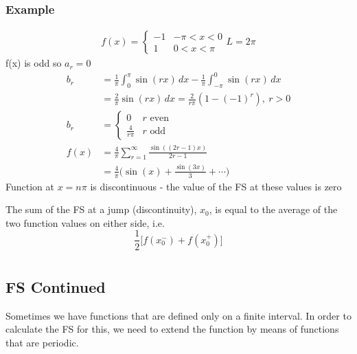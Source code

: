 \documentclass[a4paper, 11pt, normalem]{report}
\begin{document}
\subsection{Example}
\begin{gather*}
    f(x) =  \begin{cases}
                -1 & -\pi < x < 0 \\
                1 & 0 < x < \pi
            \end{cases}
    L = 2\pi
\end{gather*}
f(x) is odd so $a_r = 0$
\begin{align*}
    b_r &= \frac{1}{\pi} \int_{0}^{\pi} \sin(rx) \, dx - \frac{1}{\pi} \int_{-\pi}^{0} \sin(rx) \, dx \\
    &= \frac{2}{\pi} \sin(rx) \, dx = \frac{2}{r\pi} (1 - (-1)^r),~ r > 0 \\
    b_r &=  \begin{cases}
                0 & r \text{ even} \\
                \frac{4}{r\pi} & r \text{ odd}
            \end{cases} \\
    f(x) &= \frac{4}{\pi} \sum_{r = 1}^{\infty} \frac{\sin((2r - 1)x)}{2r - 1}\\
         &= \frac{4}{\pi} \Big(\sin(x) + \frac{\sin(3x)}{3} + \cdots \Big)
\end{align*}
Function at $x = n\pi$ is discontinuous - the value of the FS at these values is zero

The sum of the FS at a jump (discontinuity), $x_0$, is equal to the average of the two function values on either side, i.e.
\begin{equation*}
    \frac{1}{2}\big[f(x_{0}^-) + f(x_{0}^+) \big]
\end{equation*}

\chapter{}
\section{FS Continued}
Sometimes we have functions that are defined only on a finite interval. In order to calculate the FS for this, we need to extend the function by means of functions that are periodic.
\end{document}

